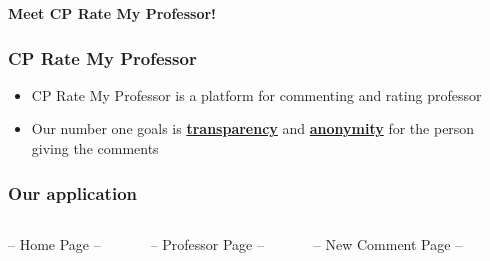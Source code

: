 \documentclass[aspectratio=169]{beamer}
\begin{document}
\begin{frame}
\begin{columns}
\begin{column}{0.4\textwidth}
        \end{column}
    \end{columns}
\end{frame}
\begin{frame}
    \centering
    {\huge \textbf{Meet CP Rate My Professor!}}
\end{frame}
\begin{frame}
    \frametitle{CP Rate My Professor}
    \begin{itemize}
        \pause
        \item CP Rate My Professor is a platform for commenting and rating professor\pause
        \item Our number one goals is \underline{\textbf{transparency}} and \underline{\textbf{anonymity}} for the person giving the comments
    \end{itemize}
\end{frame}
\begin{frame}
    \frametitle{Our application}
    \begin{center}
    \begin{columns}
        \begin{column}{0.3\textwidth}
            \centering
            -- Home Page --
        \end{column}
        \begin{column}{0.3\textwidth}
            \centering
            -- Professor Page --

        \end{column}
        \centering
        -- New Comment Page --
        \begin{column}{0.3\textwidth}

        \end{column}
    \end{columns}
    \end{center}
\end{frame}
\end{document}
